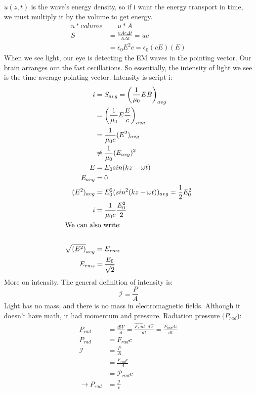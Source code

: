     $u(z,t)$ is the wave's energy density, so if i want the energy transport in time, we must multiply it by the volume to get energy.
    \begin{align*}
        u*volume&=u*A\\
        S&=\frac{uAc\Delta t}{A\Delta t}=uc\\
        &=\epsilon_0E^2c=\epsilon_0(cE)(E)
    \end{align*}
    When we see light, our eye is detecting the EM waves in the pointing vector. Our brain arranges out the fast oscillations. So essentially, the intensity of light we see is the time-average pointing vector. Intensity is script i:
    \begin{align*}
        i&=S_{avg}=\left(\frac{1}{\mu_0}EB\right)_{avg}\\
        &=\left(\frac{1}{\mu_0}E\frac{E}{c}\right)_{avg}\\
        &=\frac{1}{\mu_0c}(E^2)_{avg}\\
        &\neq\frac{1}{\mu_0}(E_{avg})^2\\
        E&=E_0sin(kz-\omega t)\\
        E_{avg}&=0\\
        (E^2)_{avg}&=E_0^2(sin^2(kz-\omega t))_{avg}=\frac{1}{2}E_0^2\\
        i&=\frac{1}{\mu_0c}\frac{E_0^2}{2}\\
        \shortintertext{We can also write:}\\
        \sqrt{(E^2)}_{avg}&=E_{rms}\\
        E_{rms}&=\frac{E_0}{\sqrt{2}}
    \end{align*}
    More on intensity. The general definition of intensity is:
    \begin{equation*}
        \mathscr{I}=\frac{P}{A}
    \end{equation*}
    Light has no mass, and there is no mass in electromagnetic fields. Although it doesn't have math, it had momentum and pressure. Radiation pressure $(P_{rad}$):
    \begin{align*}
        P_{rad}&=\frac{dW}{d}=\frac{\vec{F_rad}\cdot d\vec{z}}{dt}=\frac{F_{rad}dz}{dt}\\
        P_{rad}&=F_{rad}c\\
        \mathscr{I}&=\frac{P}{A}\\
        &=\frac{F_{rad}c}{A}\\
        &=\mathscr{P}_{rad}c\\
        \to P_{rad}&=\frac{\mathscr{I}}{c}\\
    \end{align*}
